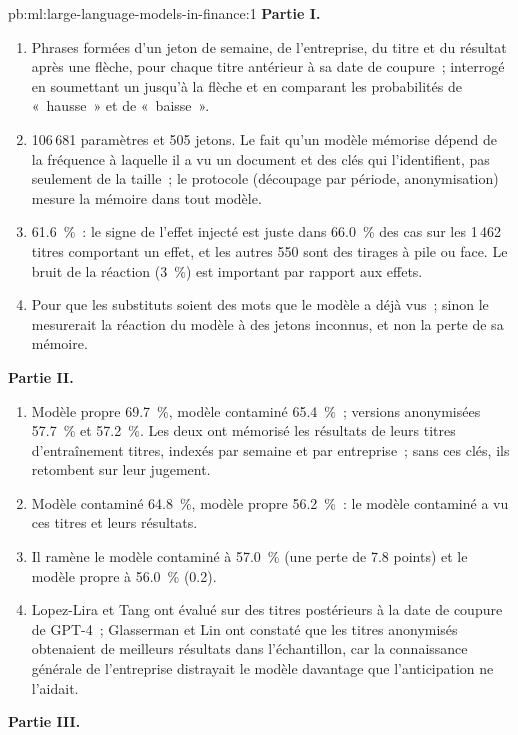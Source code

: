 \begin{solution}{pb:ml:large-language-models-in-finance:1}
\textbf{Partie I.}
\begin{enumerate}
\item Phrases formées d'un jeton de semaine, de l'entreprise, du titre et du résultat après une flèche, pour chaque titre antérieur à sa
date de coupure~; interrogé en soumettant un  jusqu'à la flèche et en comparant les probabilités de «~hausse~» et de «~baisse~».
\item 106\,681 paramètres et 505 jetons. Le fait qu'un modèle mémorise dépend de la fréquence à laquelle il a vu un document et des clés qui
l'identifient, pas seulement de la taille~; le protocole (découpage par période, anonymisation) mesure la mémoire dans tout modèle.
\item 61.6~\%~: le signe de l'effet injecté est juste dans 66.0~\% des cas sur les 1\,462 titres comportant un effet, et les
autres 550 sont des tirages à pile ou face. Le bruit de la réaction (3~\%) est important par rapport aux effets.
\item Pour que les substituts soient des mots que le modèle a déjà vus~; sinon le  mesurerait la réaction du modèle
à des jetons inconnus, et non la perte de sa mémoire.
\end{enumerate}
\textbf{Partie II.}
\begin{enumerate}[resume]
\item Modèle propre 69.7~\%, modèle contaminé 65.4~\%~; versions anonymisées 57.7~\% et 57.2~\%. Les deux ont mémorisé les résultats de leurs titres d'entraînement
titres, indexés par semaine et par entreprise~; sans ces clés, ils retombent sur leur jugement.
\item Modèle contaminé 64.8~\%, modèle propre 56.2~\%~: le modèle contaminé a vu ces titres et leurs résultats.
\item Il ramène le modèle contaminé à 57.0~\% (une perte de 7.8 points) et le modèle propre à 56.0~\% (0.2).
\item Lopez-Lira et Tang ont évalué sur des titres postérieurs à la date de coupure de GPT-4~; Glasserman et Lin ont constaté que les titres anonymisés
obtenaient de meilleurs résultats dans l'échantillon, car la connaissance générale de l'entreprise distrayait le modèle davantage que l'anticipation ne l'aidait.
\end{enumerate}
\textbf{Partie III.}
\begin{enumerate}[resume]

\end{enumerate}
\end{solution}
